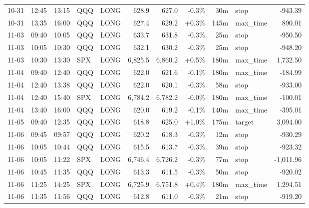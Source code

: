 \documentclass[11pt,a4paper,twoside]{article}
\begin{document}
\begin{center}
\begin{longtable}{>{\color{txtmain}}l l l l l r r r r >{\color{txtmain}}l r}
10-31 & 12:45 & 13:15 & QQQ & LONG & 628.9 & 627.0 & \textcolor{lossred}{-0.3\%} & 30m & stop & \textcolor{lossred}{-943.39} \\
10-31 & 13:35 & 16:00 & QQQ & LONG & 627.4 & 629.2 & \textcolor{wingreen}{+0.3\%} & 145m & max\_time & \textcolor{wingreen}{890.01} \\
11-03 & 09:40 & 10:05 & QQQ & LONG & 633.7 & 631.8 & \textcolor{lossred}{-0.3\%} & 25m & stop & \textcolor{lossred}{-950.50} \\
11-03 & 10:05 & 10:30 & QQQ & LONG & 632.1 & 630.2 & \textcolor{lossred}{-0.3\%} & 25m & stop & \textcolor{lossred}{-948.20} \\
11-03 & 10:30 & 13:30 & SPX & LONG & 6,825.5 & 6,860.2 & \textcolor{wingreen}{+0.5\%} & 180m & max\_time & \textcolor{wingreen}{1,732.50} \\
11-04 & 09:40 & 12:40 & QQQ & LONG & 622.0 & 621.6 & \textcolor{lossred}{-0.1\%} & 180m & max\_time & \textcolor{lossred}{-184.99} \\
11-04 & 12:40 & 13:38 & QQQ & LONG & 622.0 & 620.1 & \textcolor{lossred}{-0.3\%} & 58m & stop & \textcolor{lossred}{-933.00} \\
11-04 & 12:40 & 15:40 & SPX & LONG & 6,784.2 & 6,782.2 & \textcolor{lossred}{-0.0\%} & 180m & max\_time & \textcolor{lossred}{-100.01} \\
11-04 & 13:40 & 16:00 & QQQ & LONG & 620.0 & 619.2 & \textcolor{lossred}{-0.1\%} & 140m & max\_time & \textcolor{lossred}{-395.01} \\
11-05 & 09:40 & 12:35 & QQQ & LONG & 618.8 & 625.0 & \textcolor{wingreen}{+1.0\%} & 175m & target & \textcolor{wingreen}{3,094.00} \\
11-06 & 09:45 & 09:57 & QQQ & LONG & 620.2 & 618.3 & \textcolor{lossred}{-0.3\%} & 12m & stop & \textcolor{lossred}{-930.29} \\
11-06 & 10:05 & 10:44 & QQQ & LONG & 615.5 & 613.7 & \textcolor{lossred}{-0.3\%} & 39m & stop & \textcolor{lossred}{-923.32} \\
11-06 & 10:05 & 11:22 & SPX & LONG & 6,746.4 & 6,726.2 & \textcolor{lossred}{-0.3\%} & 77m & stop & \textcolor{lossred}{-1,011.96} \\
11-06 & 10:45 & 11:35 & QQQ & LONG & 613.3 & 611.5 & \textcolor{lossred}{-0.3\%} & 50m & stop & \textcolor{lossred}{-920.02} \\
11-06 & 11:25 & 14:25 & SPX & LONG & 6,725.9 & 6,751.8 & \textcolor{wingreen}{+0.4\%} & 180m & max\_time & \textcolor{wingreen}{1,294.51} \\
11-06 & 11:35 & 11:56 & QQQ & LONG & 612.8 & 611.0 & \textcolor{lossred}{-0.3\%} & 21m & stop & \textcolor{lossred}{-919.20} \\

\end{longtable}
\end{center}
\end{document}

